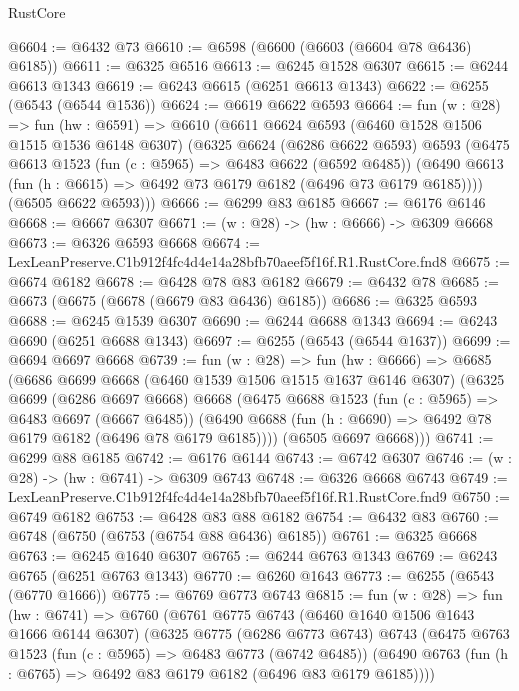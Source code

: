 \begin{lexlean}{RustCore}
\begin{coremodule}
@6604 := @6432 @73
@6610 := @6598 (@6600 (@6603 (@6604 @78 @6436) @6185))
@6611 := @6325 @6516
@6613 := @6245 @1528 @6307
@6615 := @6244 @6613 @1343
@6619 := @6243 @6615 (@6251 @6613 @1343)
@6622 := @6255 (@6543 (@6544 @1536))
@6624 := @6619 @6622 @6593
@6664 := fun (w : @28) =>
  fun (hw : @6591) =>
  @6610
    (@6611
      @6624
      @6593
      (@6460 @1528 @1506 @1515 @1536 @6148 @6307)
      (@6325
        @6624
        (@6286 @6622 @6593)
        @6593
        (@6475
          @6613
          @1523
          (fun (c : @5965) => @6483 @6622 (@6592 @6485))
          (@6490 @6613 (fun (h : @6615) => @6492 @73 @6179 @6182 (@6496 @73 @6179 @6185))))
        (@6505 @6622 @6593)))
@6666 := @6299 @83 @6185
@6667 := @6176 @6146
@6668 := @6667 @6307
@6671 := (w : @28) -> (hw : @6666) -> @6309 @6668
@6673 := @6326 @6593 @6668
@6674 := LexLeanPreserve.C1b912f4fc4d4e14a28bfb70aeef5f16f.R1.RustCore.fnd8
@6675 := @6674 @6182
@6678 := @6428 @78 @83 @6182
@6679 := @6432 @78
@6685 := @6673 (@6675 (@6678 (@6679 @83 @6436) @6185))
@6686 := @6325 @6593
@6688 := @6245 @1539 @6307
@6690 := @6244 @6688 @1343
@6694 := @6243 @6690 (@6251 @6688 @1343)
@6697 := @6255 (@6543 (@6544 @1637))
@6699 := @6694 @6697 @6668
@6739 := fun (w : @28) =>
  fun (hw : @6666) =>
  @6685
    (@6686
      @6699
      @6668
      (@6460 @1539 @1506 @1515 @1637 @6146 @6307)
      (@6325
        @6699
        (@6286 @6697 @6668)
        @6668
        (@6475
          @6688
          @1523
          (fun (c : @5965) => @6483 @6697 (@6667 @6485))
          (@6490 @6688 (fun (h : @6690) => @6492 @78 @6179 @6182 (@6496 @78 @6179 @6185))))
        (@6505 @6697 @6668)))
@6741 := @6299 @88 @6185
@6742 := @6176 @6144
@6743 := @6742 @6307
@6746 := (w : @28) -> (hw : @6741) -> @6309 @6743
@6748 := @6326 @6668 @6743
@6749 := LexLeanPreserve.C1b912f4fc4d4e14a28bfb70aeef5f16f.R1.RustCore.fnd9
@6750 := @6749 @6182
@6753 := @6428 @83 @88 @6182
@6754 := @6432 @83
@6760 := @6748 (@6750 (@6753 (@6754 @88 @6436) @6185))
@6761 := @6325 @6668
@6763 := @6245 @1640 @6307
@6765 := @6244 @6763 @1343
@6769 := @6243 @6765 (@6251 @6763 @1343)
@6770 := @6260 @1643
@6773 := @6255 (@6543 (@6770 @1666))
@6775 := @6769 @6773 @6743
@6815 := fun (w : @28) =>
  fun (hw : @6741) =>
  @6760
    (@6761
      @6775
      @6743
      (@6460 @1640 @1506 @1643 @1666 @6144 @6307)
      (@6325
        @6775
        (@6286 @6773 @6743)
        @6743
        (@6475
          @6763
          @1523
          (fun (c : @5965) => @6483 @6773 (@6742 @6485))
          (@6490 @6763 (fun (h : @6765) => @6492 @83 @6179 @6182 (@6496 @83 @6179 @6185))))

\end{coremodule}
\end{lexlean}
